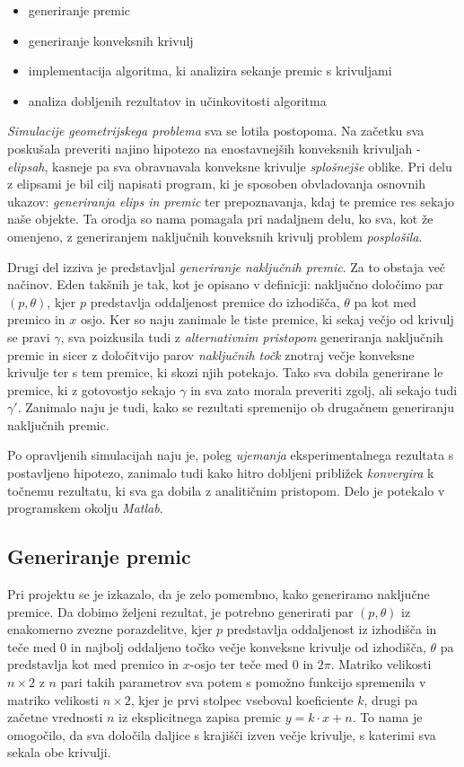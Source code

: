 \documentclass[a4paper]{article}
\begin{document}
\begin{itemize}
\item generiranje premic
\item generiranje konveksnih krivulj
\item implementacija algoritma, ki analizira sekanje premic s krivuljami
\item analiza dobljenih rezultatov in učinkovitosti algoritma
\end{itemize}


\textit{Simulacije geometrijskega problema} sva se lotila postopoma. Na začetku sva poskušala preveriti najino hipotezo na enostavnejših konveksnih krivuljah - \textit{elipsah}, kasneje pa sva obravnavala konveksne krivulje \textit{splošnejše} oblike. Pri delu z elipsami je bil cilj napisati program, ki je sposoben obvladovanja osnovnih ukazov: \textit{generiranja elips in premic} ter prepoznavanja, kdaj te premice res sekajo naše objekte. Ta orodja so nama pomagala pri nadaljnem delu, ko sva, kot že omenjeno, z generiranjem naključnih konveksnih krivulj problem \textit{posplošila}.

Drugi del izziva je predstavljal \textit{generiranje naključnih premic}. Za to obstaja več načinov. Eden takšnih je tak, kot je opisano v definicji: naključno določimo par $(p,\theta)$, kjer $p$ predstavlja oddaljenost premice do izhodišča, $\theta$ pa kot med premico in $x$ osjo. Ker so naju zanimale le tiste premice, ki sekaj večjo od krivulj se pravi $\gamma$, sva poizkusila tudi z \textit{alternativnim pristopom} generiranja naključnih premic in sicer z določitvijo parov \textit{naključnih točk} znotraj večje konveksne krivulje ter s tem premice, ki skozi njih potekajo. Tako sva dobila generirane le premice, ki z gotovostjo sekajo $\gamma$ in sva zato morala preveriti zgolj, ali sekajo tudi $\gamma'$. Zanimalo naju je tudi, kako se rezultati spremenijo ob drugačnem generiranju naključnih premic.

Po opravljenih simulacijah naju je, poleg \textit{ujemanja} eksperimentalnega rezultata s postavljeno hipotezo, zanimalo tudi kako hitro dobljeni približek \textit{konvergira} k točnemu  rezultatu, ki sva ga dobila z analitičnim pristopom. Delo je potekalo v programskem okolju \textit{Matlab}.

\subsection{Generiranje premic}
Pri projektu se je izkazalo, da je zelo pomembno, kako generiramo naključne premice. Da dobimo željeni rezultat, je potrebno generirati par $(p, \theta)$ iz enakomerno zvezne porazdelitve, kjer $p$ predstavlja oddaljenost iz izhodišča in teče med $0$ in najbolj oddaljeno točko večje konveksne krivulje od izhodišča, $\theta$ pa predstavlja kot med premico in $x$-osjo ter teče med $0$ in $2\pi$. Matriko velikosti $n\times2$ z $n$ pari takih parametrov sva potem s pomožno funkcijo spremenila v matriko velikosti $n\times2$, kjer je prvi stolpec vseboval koeficiente $k$, drugi pa začetne vrednosti $n$ iz eksplicitnega zapisa premic $y=k\cdot x+n$. To nama je omogočilo, da sva določila daljice s krajišči izven večje krivulje, s katerimi sva sekala obe krivulji.
\end{document}
